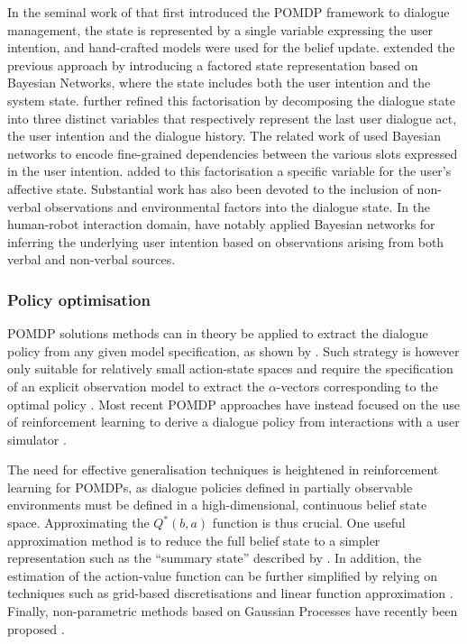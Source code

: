 In the seminal work of \cite{Roy:2000} that first introduced the POMDP framework to dialogue management, the state is represented by a single variable expressing the user intention, and hand-crafted models were used for the belief update. \cite{zhang2001} extended the previous approach by introducing a factored state representation based on Bayesian Networks, where the state includes both the user intention and the system state. \cite{williams2005factored,Young:2010} further refined this factorisation by decomposing the dialogue state into three distinct variables that respectively represent the last user dialogue act, the user intention and the dialogue history. The related work of \cite{Thomson:2010:BUD:1772996.1773040} used Bayesian networks to encode fine-grained dependencies between the various slots expressed in the user intention. \cite{bui2010} added to this factorisation a specific variable for the user's affective state. Substantial work has also been devoted to the inclusion of non-verbal observations and environmental factors into the dialogue state. In the human-robot interaction domain, \cite{prodanov2003bayesian,Hong:2007} have notably applied Bayesian networks for inferring the underlying user intention based on observations arising from both verbal and non-verbal sources. 

\subsubsection*{Policy optimisation}

POMDP solutions methods can in theory be applied to extract the dialogue policy from any given model specification, as shown by \cite{Williams:2007,Williamsetal:2008}.  Such strategy is however only suitable for relatively small action-state spaces and require the specification of an explicit observation model to extract the $\alpha$-vectors corresponding to the optimal policy \citep{shani2013}. Most recent POMDP approaches have instead focused on the use of reinforcement learning to derive a dialogue policy from interactions with a user simulator \citep{Young:2010,Thomson:2010:BUD:1772996.1773040, daubigney2012}.

The need for effective generalisation techniques is heightened in reinforcement learning for POMDPs, as dialogue policies defined in partially observable environments must be defined in a high-dimensional, continuous belief state space.  Approximating the $Q^*(b,a)$ function is thus crucial. One useful approximation method is to reduce the full belief state to a simpler representation such as the ``summary state'' described by \cite{williams2005}. In addition, the estimation of the action-value function can be further simplified by relying on techniques such as grid-based discretisations \citep{Young:2010} and linear function approximation  \citep{Thomson:2010:BUD:1772996.1773040, daubigney2012}. Finally, non-parametric methods based on Gaussian Processes have recently been proposed \citep{gasic2011}. 

